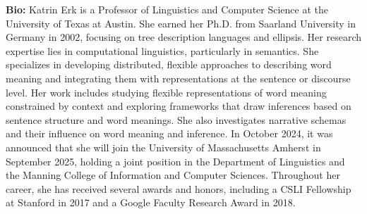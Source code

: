 {\textbf{Bio:}}
Katrin Erk is a Professor of Linguistics and Computer Science at the University of Texas at Austin. She earned her Ph.D. from Saarland University in Germany in 2002, focusing on tree description languages and ellipsis. Her research expertise lies in computational linguistics, particularly in semantics. She specializes in developing distributed, flexible approaches to describing word meaning and integrating them with representations at the sentence or discourse level. Her work includes studying flexible representations of word meaning constrained by context and exploring frameworks that draw inferences based on sentence structure and word meanings. She also investigates narrative schemas and their influence on word meaning and inference. In October 2024, it was announced that she will join the University of Massachusetts Amherst in September 2025, holding a joint position in the Department of Linguistics and the Manning College of Information and Computer Sciences. Throughout her career, she has received several awards and honors, including a CSLI Fellowship at Stanford in 2017 and a Google Faculty Research Award in 2018.\\

\clearpage